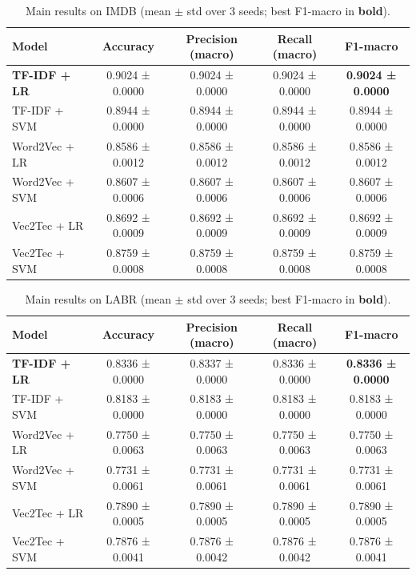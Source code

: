 \begin{table}[ht]
\centering
\caption{Main results on IMDB (mean $\pm$ std over 3 seeds; best F1-macro in \textbf{bold}).}
\label{tab:main_results_imdb}
\begin{tabular}{lcccc}
\toprule
Model & Accuracy & Precision (macro) & Recall (macro) & F1-macro \\
\midrule
\textbf{TF-IDF + LR} & 0.9024 ± 0.0000 & 0.9024 ± 0.0000 & 0.9024 ± 0.0000 & \textbf{0.9024 ± 0.0000} \\
TF-IDF + SVM & 0.8944 ± 0.0000 & 0.8944 ± 0.0000 & 0.8944 ± 0.0000 & 0.8944 ± 0.0000 \\
Word2Vec + LR & 0.8586 ± 0.0012 & 0.8586 ± 0.0012 & 0.8586 ± 0.0012 & 0.8586 ± 0.0012 \\
Word2Vec + SVM & 0.8607 ± 0.0006 & 0.8607 ± 0.0006 & 0.8607 ± 0.0006 & 0.8607 ± 0.0006 \\
Vec2Tec + LR & 0.8692 ± 0.0009 & 0.8692 ± 0.0009 & 0.8692 ± 0.0009 & 0.8692 ± 0.0009 \\
Vec2Tec + SVM & 0.8759 ± 0.0008 & 0.8759 ± 0.0008 & 0.8759 ± 0.0008 & 0.8759 ± 0.0008 \\
\bottomrule
\end{tabular}
\end{table}

\begin{table}[ht]
\centering
\caption{Main results on LABR (mean $\pm$ std over 3 seeds; best F1-macro in \textbf{bold}).}
\label{tab:main_results_labr}
\begin{tabular}{lcccc}
\toprule
Model & Accuracy & Precision (macro) & Recall (macro) & F1-macro \\
\midrule
\textbf{TF-IDF + LR} & 0.8336 ± 0.0000 & 0.8337 ± 0.0000 & 0.8336 ± 0.0000 & \textbf{0.8336 ± 0.0000} \\
TF-IDF + SVM & 0.8183 ± 0.0000 & 0.8183 ± 0.0000 & 0.8183 ± 0.0000 & 0.8183 ± 0.0000 \\
Word2Vec + LR & 0.7750 ± 0.0063 & 0.7750 ± 0.0063 & 0.7750 ± 0.0063 & 0.7750 ± 0.0063 \\
Word2Vec + SVM & 0.7731 ± 0.0061 & 0.7731 ± 0.0061 & 0.7731 ± 0.0061 & 0.7731 ± 0.0061 \\
Vec2Tec + LR & 0.7890 ± 0.0005 & 0.7890 ± 0.0005 & 0.7890 ± 0.0005 & 0.7890 ± 0.0005 \\
Vec2Tec + SVM & 0.7876 ± 0.0041 & 0.7876 ± 0.0042 & 0.7876 ± 0.0042 & 0.7876 ± 0.0041 \\
\bottomrule
\end{tabular}
\end{table}

